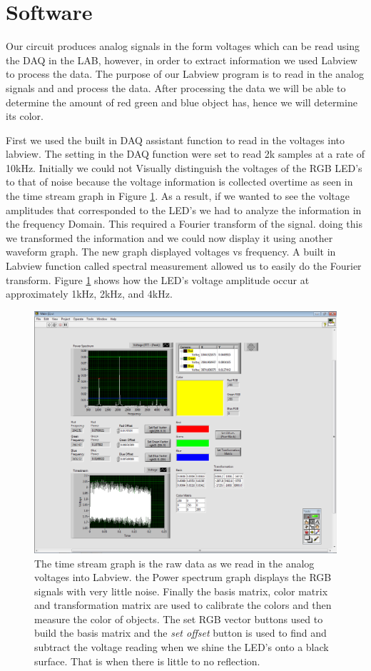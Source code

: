 \documentclass[paper=letter, fontsize=12pt]{article}
\begin{document}
\section*{Software}

Our circuit produces analog signals in the form voltages which can be read using the DAQ in the LAB, however, in order to extract information we used Labview to process the data. The purpose of our Labview program is to read in the analog signals and and process the data. After processing the data we will be able to determine the amount of red green and blue object has, hence we will determine its color.

First we used the built in DAQ assistant function to read in the voltages into labview. The setting in the DAQ function were set to read 2k samples at a rate of 10kHz. Initially we could not Visually distinguish the voltages of the RGB LED's to that of noise because the voltage information is collected overtime as seen in the time stream graph in Figure \ref*{front}. As a result, if we wanted to see the voltage amplitudes that corresponded to the LED's we had to analyze the information in the frequency Domain. This required a Fourier transform of the signal. doing this we transformed the information and we could now display it using another waveform graph. The new graph displayed voltages vs frequency. A built in Labview function called spectral measurement allowed us to easily do the Fourier transform. Figure \ref*{front} shows how the LED's voltage amplitude occur at approximately 1kHz, 2kHz, and 4kHz.

\begin{figure}[H]
\centering
\includegraphics[scale=.4]{front_panel_yellow.png}
\caption{The time stream graph is the raw data as we read in the analog voltages into Labview. the Power spectrum graph displays the RGB signals with very little noise. Finally the basis matrix, color matrix and transformation matrix are used to calibrate the colors and then measure the color of objects. The set RGB vector buttons used to build the basis matrix and the \textit{set offset }button is used to find and subtract the voltage reading when we shine the LED's onto a black surface. That is when there is little to no reflection.}
\label{front}
\end{figure}
\end{document}
